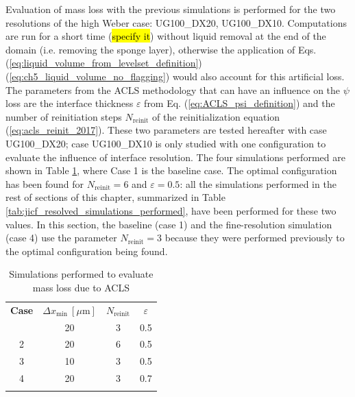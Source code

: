 Evaluation of mass loss with the previous simulations is performed for the two resolutions of the high Weber case: UG100\_DX20, UG100\_DX10. Computations are run for a short time (\hl{specify it}) without liquid removal at the end of the domain (i.e. removing the sponge layer), otherwise the application of Eqs. (\ref{eq:liquid_volume_from_levelset_definition}) (\ref{eq:ch5_liquid_volume_no_flagging}) would also account for this artificial loss. The parameters from the ACLS methodology that can have an influence on the $\psi$ loss are the interface thickness $\varepsilon$ from Eq. (\ref{eq:ACLS_psi_definition}) and the number of reinitiation steps $N_\mathrm{reinit}$ of the reinitialization equation (\ref{eq:acls_reinit_2017}). These two parameters are tested hereafter with case UG100\_DX20; case UG100\_DX10 is only studied with one configuration to evaluate the influence of interface resolution. The four simulations performed are shown in Table \ref{tab:jicf_simulations_mass_loss_set_levelset_band}, where Case 1 is the baseline case. The optimal configuration has been found for $N_\mathrm{reinit} = 6$  and $\varepsilon = 0.5$: all the simulations performed in the rest of sections of this chapter, summarized in Table \ref{tab:jicf_resolved_simulations_performed}, have been performed for these two values. In this section, the baseline (case 1) and the fine-resolution simulation (case 4) use the parameter $N_\mathrm{reinit} = 3$ because they were performed previously to the optimal configuration being found.

\begin{table}[!h]
\centering
\caption{Simulations performed to evaluate mass loss due to ACLS}
\begin{tabular}{cccc}
\thickhline
\textbf{Case} & $\Delta x_\mathrm{min} ~ [\mu \mathrm{m}]$ & $N_\mathrm{reinit}$ &  $\varepsilon$ \\
\thickhline
1 & 20 & 3 & 0.5 \\
2 & 20 & 6 & 0.5 \\
3 & 10 & 3 & 0.5 \\
4 & 20 & 3 & 0.7 \\
\thickhline
\end{tabular}
\label{tab:jicf_simulations_mass_loss_set_levelset_band}
\end{table}

%

